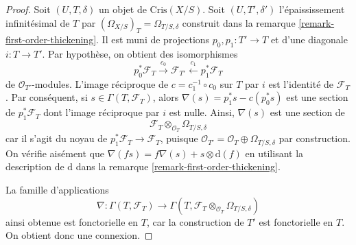 \begin{proof}
Soit $(U, T, \delta)$ un objet de $\text{Cris}(X/S)$.
Soit $(U, T', \delta')$ l'épaississement infinitésimal de $T$
par $(\Omega_{X/S})_T = \Omega_{T/S, \delta}$
construit dans la remarque \ref{remark-first-order-thickening}.
Il est muni de projections $p_0, p_1 : T' \to T$
et d'une diagonale $i : T \to T'$. Par hypothèse, on obtient des
isomorphismes
$$
p_0^*\mathcal{F}_T \xrightarrow{c_0}
\mathcal{F}_{T'} \xleftarrow{c_1}
p_1^*\mathcal{F}_T
$$
de $\mathcal{O}_{T'}$-modules. L'image réciproque de $c = c_1^{-1} \circ c_0$
sur $T$ par $i$ est l'identité
de $\mathcal{F}_T$. Par conséquent, si $s \in \Gamma(T, \mathcal{F}_T)$,
alors $\nabla(s) = p_1^*s - c(p_0^*s)$ est une section de
$p_1^*\mathcal{F}_T$ dont l'image réciproque par $i$ est nulle. Ainsi,
$\nabla(s)$ est une section de
$$
\mathcal{F}_T
\otimes_{\mathcal{O}_T}
\Omega_{T/S, \delta}
$$
car il s'agit du noyau de $p_1^*\mathcal{F}_T \to \mathcal{F}_T$,
puisque $\mathcal{O}_{T'} = \mathcal{O}_T \oplus \Omega_{T/S, \delta}$
par construction. On vérifie aisément que $\nabla(fs) =
f\nabla(s) + s \otimes \text{d}(f)$ en utilisant la description de
$\text{d}$ dans la remarque \ref{remark-first-order-thickening}.

\medskip\noindent
La famille d'applications
$$
\nabla : \Gamma(T, \mathcal{F}_T) \to
\Gamma(T, \mathcal{F}_T \otimes_{\mathcal{O}_T} \Omega_{T/S, \delta})
$$
ainsi obtenue est fonctorielle en $T$, car la construction de $T'$
est fonctorielle en $T$. On obtient donc une connexion.


\end{proof}
